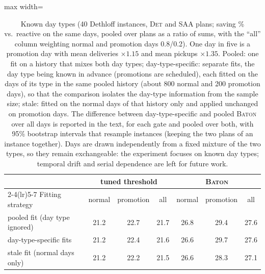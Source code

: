 \begin{table}[t]
\caption{Known day types (40 Dethloff instances, \textsc{Det} and
\textsc{SAA} plans; saving \% vs.\ reactive on the same days, pooled
over plans as a ratio of sums, with the ``all'' column weighting normal
and promotion days 0.8/0.2). One day
in five is a promotion day with mean deliveries $\times 1.15$ and mean
pickups $\times 1.35$. Pooled: one fit on a history that mixes both day
types; day-type-specific: separate fits, the day type being known in
advance (promotions are scheduled), each fitted on the days of its type
in the same pooled history (about 800 normal and 200 promotion days), so
that the comparison isolates the day-type information from the sample
size; stale: fitted on the normal days of that history only and applied
unchanged on promotion days. The difference between day-type-specific
and pooled \textsc{Baton} over all days is reported in the text, for each
gate and pooled over both, with 95\% bootstrap intervals that resample
instances (keeping the two plans of an instance together). Days are
drawn independently from a fixed mixture of the two types, so they
remain exchangeable: the experiment focuses on known day types;
temporal drift and serial dependence are left for future work.}
\label{tab:daytype}
\centering
\footnotesize
\setlength{\tabcolsep}{3.5pt}
\begin{adjustbox}{max width=\linewidth}
\begin{tabular}{l ccc ccc}
\toprule
& \multicolumn{3}{c}{tuned threshold} & \multicolumn{3}{c}{\textsc{Baton}} \\ \cmidrule(lr){2-4}\cmidrule(lr){5-7}
Fitting strategy & normal & promotion & all & normal & promotion & all \\
\midrule
pooled fit (day type ignored) & 21.2 & 22.7 & 21.7 & 26.8 & 29.4 & 27.6 \\
day-type-specific fits & 21.2 & 22.4 & 21.6 & 26.6 & 29.7 & 27.6 \\
stale fit (normal days only) & 21.2 & 22.2 & 21.5 & 26.6 & 28.3 & 27.1 \\
\bottomrule
\end{tabular}
\end{adjustbox}
\end{table}
